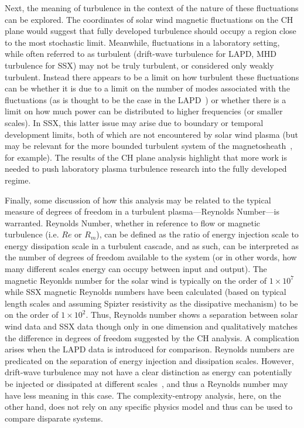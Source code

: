 \documentclass[aps,pre,twocolumn,secnumarabic,nobalancelastpage,amsmath,amssymb,
nofootinbib]{revtex4-1}
\begin{document}
Next, the meaning of turbulence in the context of the nature of these fluctuations can be explored. The coordinates of solar wind magnetic fluctuations on the CH plane would suggest that fully developed turbulence should occupy a region close to the most stochastic limit. Meanwhile, fluctuations in a laboratory setting, while often referred to as turbulent (drift-wave turbulence for LAPD, MHD turbulence for SSX) may not be truly turbulent, or considered only weakly turbulent. Instead there appears to be a limit on how turbulent these fluctuations can be whether it is due to a limit on the number of modes associated with the fluctuations (as is thought to be the case in the LAPD~\cite{maggs2013}) or whether there is a limit on how much power can be distributed to higher frequencies (or smaller scales). In SSX, this latter issue may arise due to boundary or temporal development limits, both of which are not encountered by solar wind plasma (but may be relevant for the more bounded turbulent system of the magnetosheath~\cite{SahraouiPRL2006,YordanovaPRL2008}, for example). The results of the CH plane analysis highlight that more work is needed to push laboratory plasma turbulence research into the fully developed regime.
 
Finally, some discussion of how this analysis may be related to the typical measure of degrees of freedom in a turbulent plasma---Reynolds Number---is warranted. Reynolds Number, whether in reference to flow or magnetic turbulence (i.e. $Re$ or $R_{m}$), can be defined as the ratio of energy injection scale to energy dissipation scale in a turbulent cascade, and as such, can be interpreted as the number of degrees of freedom available to the system (or in other words, how many different scales energy can occupy between input and output). The magnetic Reyonlds number for the solar wind is typically on the order of $1 \times 10^7$ while SSX magnetic Reynolds numbers have been calculated (based on typical length scales and assuming Spizter resistivity as the dissipative mechanism) to be on the order of $1 \times 10^2$. Thus, Reynolds number shows a separation between solar wind data and SSX data though only in one dimension and qualitatively matches the difference in degrees of freedom suggested by the CH analysis. A complication arises when the LAPD data is introduced for comparison. Reynolds numbers are predicated on the separation of energy injection and dissipation scales. However, drift-wave turbulence may not have a clear distinction as energy can potentially be injected or dissipated at different scales~\cite{friedman2012}, and thus a Reynolds number may have less meaning in this case. The complexity-entropy analysis, here, on the other hand, does not rely on any specific physics model and thus can be used to compare disparate systems.
\end{document}

